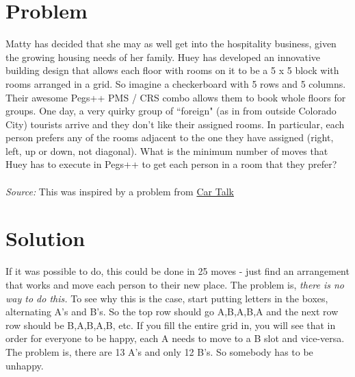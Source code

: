 \documentclass[11pt,a4paper]{report}
\theoremstyle{plain}
\theoremstyle{definition}
\theoremstyle{remark}
\begin{document}
\section*{Problem}
Matty has decided that she may as well get into the hospitality business, given the growing housing needs of her family.  Huey has developed an innovative building design that allows each floor with rooms on it to be a 5 x 5 block with rooms arranged in a grid.  So imagine a checkerboard with 5 rows and 5 columns.  Their awesome Pegs++ PMS / CRS combo allows them to book whole floors for groups.  One day, a very quirky group of ``foreign" (as in from outside Colorado City) tourists arrive and they don't like their assigned rooms.  In particular, each person prefers any of the rooms adjacent to the one they have assigned (right, left, up or down, not diagonal).  What is the minimum number of moves that Huey has to execute in Pegs++ to get each person in a room that they prefer?
\\
\\
\textit{Source:} This was inspired by a problem from \href{https://www.cartalk.com}{Car Talk}

\newpage
\section*{Solution}
If it was possible to do, this could be done in 25 moves - just find an arrangement that works and move each person to their new place.  The problem is, \emph{there is no way to do this.}  To see why this is the case, start putting letters in the boxes, alternating A's and B's.  So the top row should go A,B,A,B,A and the next row row should be B,A,B,A,B, etc.  If you fill the entire grid in, you will see that in order for everyone to be happy, each A needs to move to a B slot and vice-versa.  The problem is, there are 13 A's and only 12 B's.  So somebody has to be unhappy.
 
\end{document}
